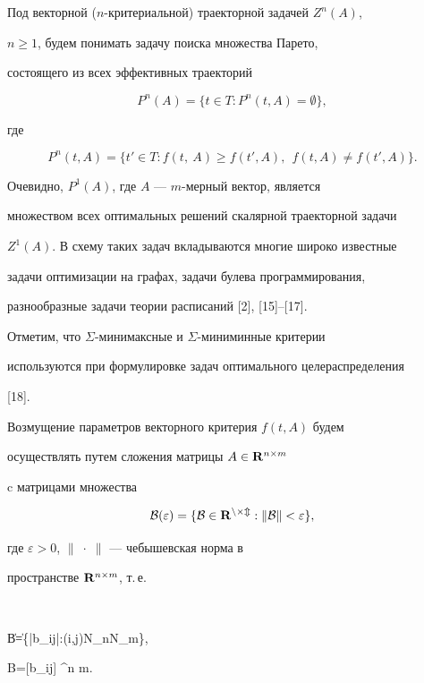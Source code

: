 Под векторной ($n$-критериальной) траекторной задачей $Z^n(A)$,


$n\geq 1$, будем понимать задачу поиска множества Парето,


состоящего из всех эффективных траекторий


$$


P^n(A)=\{ t\in T: P^n (t, A)=\emptyset \},


$$


где


$$


P^n (t, A)=\{t'\in T: f(t,\ A)\geq f(t',A),\ \ f(t, A)\neq f(t', A) \}.


$$





Очевидно, $P^1(A)$, где $A$ --- $m$-мерный вектор, является


множеством всех оптимальных решений скалярной траекторной задачи


$Z^1(A)$. В схему таких задач вкладываются многие широко известные


задачи оптимизации на графах, задачи булева программирования,


разнообразные задачи теории расписаний [2], [15]--[17].





Отметим, что $\Sigma$-минимаксные и $\Sigma$-миниминные критерии


используются при формулировке задач оптимального целераспределения


[18].





Возмущение параметров векторного критерия $f(t, A)$ будем


осуществлять путем сложения матрицы $A \in \bold {R}^{n\times m}$


c матрицами множества


$$


\cal{B}(\varepsilon)=\{ B\in \bold{R}^{n \times m} :\|B\|<\varepsilon\},


$$


где $ \varepsilon >0$, $\|\; \cdot\; \|$ --- чебышевская норма в


пространстве $\bold{R}^{n \times m}$, т.\,е.


$$


\|B\|=\max\{|b_{ij}|:(i,j)\in N_n\times N_m\},\quad


B=[b_{ij}] \in {}^{n \times m}.


